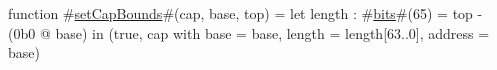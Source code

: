 function #\hyperref[zsetCapBounds]{setCapBounds}#(cap, base, top) =
    let length : #\hyperref[zbits]{bits}#(65) = top - (0b0 @ base) in
    (true, {cap with base = base, length = length[63..0], address = base})
